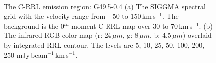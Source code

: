\documentclass[manuscript]{aastex61}
\newcommand{\kms}{\,km\,s$^{-1}$}
\newcommand{\um}{\mu m}
\begin{document}
\begin{figure}[H]
\centering
{}
\\
\caption{The C-RRL emission region: G49.5-0.4
          (a) The SIGGMA spectral grid with the velocity range from $-50$ to $150$\kms.
	  The background is the 0$^{th}$ moment C-RRL map over $30$ to $70$\kms.
	  (b) The infrared RGB color map (r: 24\,$\um$, g: 8\,$\um$, b: 4.5\,$\um$) overlaid by integrated RRL contour.
	  The levels are 5, 10, 25, 50, 100, 200, 250 mJy\,beam$^{-1}$\kms.}
\label{fig_crrl-g494}
\end{figure}
\end{document}
